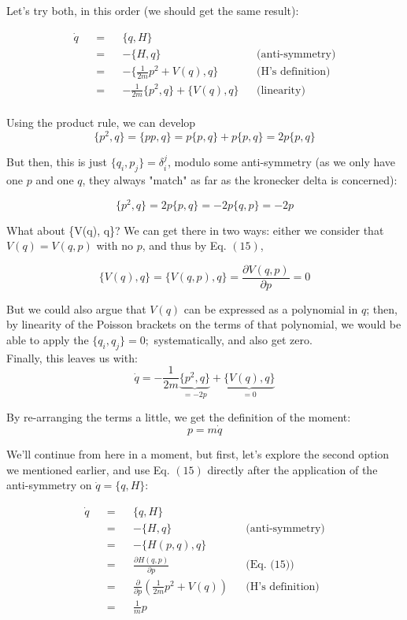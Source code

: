 \documentclass[solutions.tex]{subfiles}
\begin{document}
Let's try both, in this order (we should get the same result):

\begin{equation*}\begin{aligned}
	\dot{q} &&=&& \{q, H\} && ~ \\
	~ &&=&& -\{H, q\} && \text{(anti-symmetry)} \\
	~ &&=&& -\{\frac1{2m}p^2+V(q), q\} && \text{(H's definition)} \\
	~ &&=&& -\frac1{2m}\{p^2, q\} + \{V(q), q\} && \text{(linearity)} \\
\end{aligned}\end{equation*}

Using the product rule, we can develop
\[	\{p^2, q\} = \{ p p, q \} = p \{ p, q \} + p \{ p, q \} = 2p\{p, q\} \]

But then, this is just $\{ q_i, p_j \} = \delta_i^j$, modulo some
anti-symmetry (as we only have one $p$ and one $q$, they always "match"
as far as the kronecker delta is concerned):

\[ \{p^2, q\} = 2p\{p, q\} = -2p\{q, p\} = -2p \]

What about \{V(q), q\}? We can get there in two ways: either we consider
that $V(q) = V(q, p)$ with no $p$, and thus by Eq. $(15)$,

\[ \{V(q), q\} = \{V(q, p), q\} = \frac{\partial V(q, p)}{\partial p} = 0 \]

But we could also argue that $V(q)$ can be expressed as a polynomial in $q$;
then, by linearity of the Poisson brackets on the terms of that polynomial,
we would be able to apply the $\{ q_i, q_j \} = 0;$ systematically, and
also get zero. \\

Finally, this leaves us with:
\[
	\dot{q} = -\frac1{2m}\underbrace{\{p^2, q\}}_{=-2p} + \underbrace{\{V(q), q\}}_{=0}
\]

By re-arranging the terms a little, we get the definition of the moment:
\[
	\boxed{p = m\dot{q}}
\]

We'll continue from here in a moment, but first, let's explore the second
option we mentioned earlier, and use Eq. $(15)$ directly after the application
of the anti-symmetry on $\dot{q} = \{q, H\}$:

\begin{equation*}\begin{aligned}
	\dot{q} &&=&& \{q, H\} && ~ \\
	~ &&=&& -\{H, q\} && \text{(anti-symmetry)} \\
	~ &&=&& -\{H(p, q), q\} && ~ \\
	~ &&=&& \frac{\partial H(q, p)}{\partial p} && \text{(Eq. (15))} \\
	~ &&=&& \frac{\partial}{\partial p}\left(\frac1{2m}p^2+V(q)\right) && \text{(H's definition)} \\
	~ &&=&& \frac1m p
\end{aligned}\end{equation*}
\end{document}
